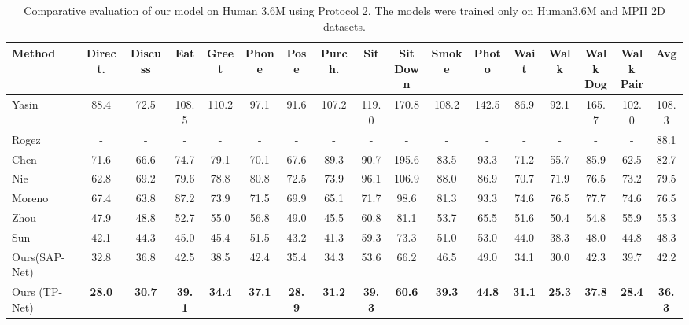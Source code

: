 \documentclass[runningheads]{llncs}
\begin{document}
\begin{table*}[!h]
\fontsize{7}{8}\selectfont 
\centering
\setlength\tabcolsep{1pt}
\begin{tabular}{lcccccccccccccccc}
\hline
Method & Direct. & Discuss & Eat & Greet & Phone & Pose & Purch. & Sit & \shortstack{Sit\\Down} & Smoke & Photo & Wait & Walk & \shortstack{Walk\\Dog} & \shortstack{Walk\\Pair} & Avg  \\
\hline
\hline
Yasin~\cite{yasin2016dual} & 88.4 & 72.5 & 108.5 & 110.2 & 97.1 & 91.6 & 107.2 & 119.0  & 170.8 & 108.2 & 142.5 & 86.9 & 92.1 & 165.7 & 102.0 & 108.3 \\
Rogez~\cite{rogezNIPS} & - & - & - & - & - & - & - & - & - & - & - & - & - & - & - & 88.1 \\
Chen~\cite{Chen_2017_CVPR} & 71.6 & 66.6 & 74.7 & 79.1 & 70.1 & 67.6 & 89.3 & 90.7  & 195.6 & 83.5 & 93.3 & 71.2 & 55.7 & 85.9 & 62.5 & 82.7  \\
Nie~\cite{Nie_2017_ICCV} & 62.8 & 69.2 & 79.6 & 78.8 & 80.8 & 72.5 & 73.9 & 96.1 & 106.9 & 88.0 & 86.9 & 70.7 & 71.9 & 76.5 & 73.2 & 79.5  \\
Moreno~\cite{Moreno-Noguer_2017_CVPR} & 67.4 & 63.8 & 87.2 & 73.9 & 71.5 & 69.9 & 65.1 & 71.7  & 98.6 & 81.3 & 93.3 & 74.6 & 76.5 & 77.7 & 74.6 & 76.5 \\
Zhou~\cite{zhou2016sparseness} & 47.9 & 48.8 & 52.7 & 55.0 & 56.8 & 49.0 & 45.5 & 60.8 & 81.1 & 53.7 & 65.5 & 51.6 & 50.4 & 54.8 & 55.9 & 55.3  \\
Sun~\cite{Sun_2017_ICCV} & 42.1 & 44.3 & 45.0 & 45.4 & 51.5 & 43.2 & 41.3 & 59.3 & 73.3 & 51.0 & 53.0 & 44.0 & 38.3 & 48.0 & 44.8 & 48.3 \\
\hline
Ours(SAP-Net) & 32.8 & 36.8 & 42.5 & 38.5 & 42.4 & 35.4 & 34.3 &  53.6 & 66.2 & 46.5 & 49.0 & 34.1 & 30.0 & 42.3 & 39.7 & 42.2  \\
Ours (TP-Net) & \textbf{28.0} & \textbf{30.7} & \textbf{39.1} & \textbf{34.4} & \textbf{37.1} & \textbf{28.9} & \textbf{31.2} & \textbf{39.3} & \textbf{60.6} & \textbf{39.3} & \textbf{44.8} & \textbf{31.1} & \textbf{25.3} & \textbf{37.8} & \textbf{28.4} & \textbf{36.3}  \\
\hline
\end{tabular}
\vskip 2mm
  \caption{Comparative evaluation of our model on Human 3.6M using Protocol 2. The models were trained only on Human3.6M and MPII 2D datasets.} \label{tab:h36mp2}
\vspace{-2em}
\end{table*}
\end{document}
